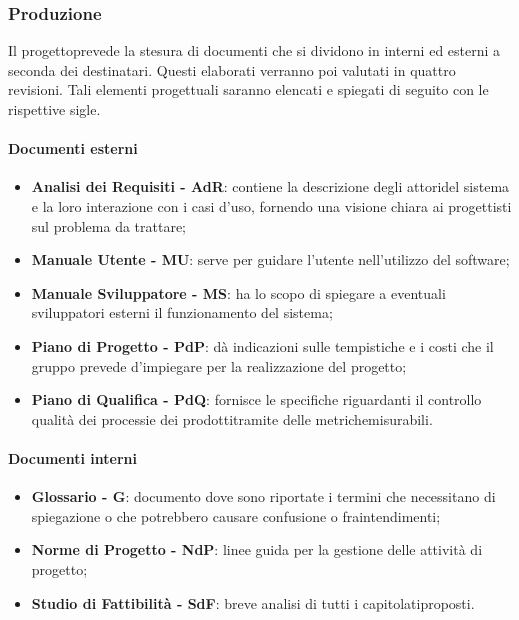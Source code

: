             \subsubsection{Produzione}
                    Il progetto\glosp prevede la stesura di documenti che si dividono in interni ed esterni a seconda dei destinatari. Questi elaborati verranno poi valutati
                    in quattro revisioni. Tali elementi progettuali saranno elencati e spiegati di seguito con le rispettive sigle.
                \paragraph{Documenti esterni}
                    \begin{itemize}
                        \item \textbf{Analisi dei Requisiti - AdR}: contiene la descrizione degli attori\glosp del sistema e la loro interazione con i casi d'uso\glo,
                                                                    fornendo una visione chiara ai progettisti sul problema da trattare;
                        \item \textbf{Manuale Utente - MU}: serve per guidare l'utente nell'utilizzo del software;
                        \item \textbf{Manuale Sviluppatore - MS}: ha lo scopo di spiegare a eventuali sviluppatori esterni il funzionamento
                                                                  del sistema;
                        \item \textbf{Piano di Progetto - PdP}: dà indicazioni sulle tempistiche e i costi che il gruppo prevede d'impiegare
                                                                per la realizzazione del progetto\glo;
                        \item \textbf{Piano di Qualifica - PdQ}: fornisce le specifiche riguardanti il controllo qualità dei processi\glosp e dei
                                                                 prodotti\glosp tramite delle metriche\glosp misurabili.
                    \end{itemize}
                \paragraph{Documenti interni}
                    \begin{itemize}
                        \item \textbf{Glossario - G}: documento dove sono riportate i termini che necessitano di spiegazione o che potrebbero causare confusione o
                                                      fraintendimenti;
                        \item \textbf{Norme di Progetto - NdP}: linee guida per la gestione delle attività di progetto\glo;
                        \item \textbf{Studio di Fattibilità - SdF}: breve analisi di tutti i capitolati\glosp proposti.
                    \end{itemize}
